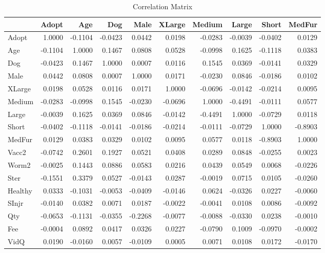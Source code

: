 \documentclass[12pt]{article}
\begin{document}
	\begin{table}[]
		\centering
		\caption{Correlation Matrix}
		\begin{tabular}{@{}l|rrrrrrrrr@{}}
			\toprule
			& Adopt & Age & Dog & Male & XLarge & Medium & Large & Short & MedFur \\ \midrule
			Adopt & 1.0000 & -0.1104 & -0.0423 & 0.0442 & 0.0198 & -0.0283 & -0.0039 & -0.0402 & 0.0129 \\
			Age & -0.1104 & 1.0000 & 0.1467 & 0.0808 & 0.0528 & -0.0998 & 0.1625 & -0.1118 & 0.0383 \\
			Dog & -0.0423 & 0.1467 & 1.0000 & 0.0007 & 0.0116 & 0.1545 & 0.0369 & -0.0141 & 0.0329 \\
			Male & 0.0442 & 0.0808 & 0.0007 & 1.0000 & 0.0171 & -0.0230 & 0.0846 & -0.0186 & 0.0102 \\
			XLarge & 0.0198 & 0.0528 & 0.0116 & 0.0171 & 1.0000 & -0.0696 & -0.0142 & -0.0214 & 0.0095 \\
			Medium & -0.0283 & -0.0998 & 0.1545 & -0.0230 & -0.0696 & 1.0000 & -0.4491 & -0.0111 & 0.0577 \\
			Large & -0.0039 & 0.1625 & 0.0369 & 0.0846 & -0.0142 & -0.4491 & 1.0000 & -0.0729 & 0.0118 \\
			Short & -0.0402 & -0.1118 & -0.0141 & -0.0186 & -0.0214 & -0.0111 & -0.0729 & 1.0000 & -0.8903 \\
			MedFur & 0.0129 & 0.0383 & 0.0329 & 0.0102 & 0.0095 & 0.0577 & 0.0118 & -0.8903 & 1.0000 \\
			Vacc2 & -0.0742 & 0.2601 & 0.1927 & 0.0521 & 0.0408 & 0.0289 & 0.0848 & -0.0255 & 0.0023 \\
			Worm2 & -0.0025 & 0.1443 & 0.0886 & 0.0583 & 0.0216 & 0.0439 & 0.0549 & 0.0068 & -0.0226 \\
			Ster & -0.1551 & 0.3379 & 0.0527 & -0.0143 & 0.0287 & -0.0019 & 0.0715 & 0.0105 & -0.0260 \\
			Healthy & 0.0333 & -0.1031 & -0.0053 & -0.0409 & -0.0146 & 0.0624 & -0.0326 & 0.0227 & -0.0060 \\
			SInjr & -0.0140 & 0.0382 & 0.0071 & 0.0187 & -0.0022 & -0.0041 & 0.0108 & 0.0086 & -0.0092 \\
			Qty & -0.0653 & -0.1131 & -0.0355 & -0.2268 & -0.0077 & -0.0088 & -0.0330 & 0.0238 & -0.0010 \\
			Fee & -0.0004 & 0.0892 & 0.0417 & 0.0326 & 0.0227 & -0.0790 & 0.1009 & -0.0970 & -0.0002 \\
			VidQ & 0.0190 & -0.0160 & 0.0057 & -0.0109 & 0.0005 & 0.0071 & 0.0108 & 0.0172 & -0.0170 \\

\end{tabular}
\end{table}
\end{document}
